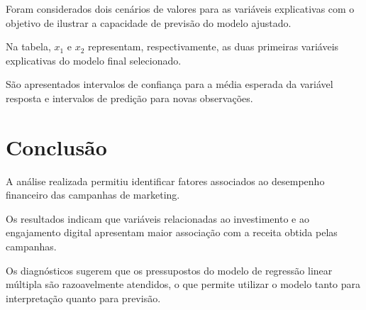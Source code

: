 \documentclass[12pt,a4paper]{article}
\begin{document}
Foram considerados dois cenários de valores para as
variáveis explicativas com o objetivo de ilustrar
a capacidade de previsão do modelo ajustado.

\begin{table}[H]
\centering
\caption{Tabela 6 -- Cenários de previsão com valores de entrada de $x_1$ e $x_2$}

\end{table}

Na tabela, $x_1$ e $x_2$ representam, respectivamente,
as duas primeiras variáveis explicativas do modelo final selecionado.

\begin{table}[H]
\centering
\caption{Previsões pontuais e intervalos para os cenários considerados}

\end{table}

São apresentados intervalos de confiança para a média
esperada da variável resposta e intervalos de predição
para novas observações.

\section{Conclusão}

A análise realizada permitiu identificar fatores associados
ao desempenho financeiro das campanhas de marketing.

Os resultados indicam que variáveis relacionadas ao
investimento e ao engajamento digital apresentam maior
associação com a receita obtida pelas campanhas.

Os diagnósticos sugerem que os pressupostos do modelo
de regressão linear múltipla são razoavelmente atendidos,
o que permite utilizar o modelo tanto para interpretação
quanto para previsão.
\end{document}
